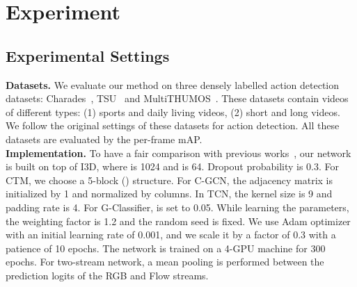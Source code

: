 \documentclass{bmvc2k}
\begin{document}
\begin{figure}[t!]
\begin{floatrow} 
  \begin{floatrow}    
\end{floatrow}

\end{floatrow}
\end{figure}

\section{Experiment}
\subsection{Experimental Settings}
\textbf{Datasets.}
We evaluate our method on three densely labelled action detection datasets: Charades~\cite{sigurdsson2017asynchronous}, TSU~\cite{dai2020toyota} and MultiTHUMOS~\cite{multi-thumos}. 
These datasets contain videos of different types: (1) sports and daily living videos, (2) short and long videos. 
We follow the original settings of these datasets for action detection. All these datasets are evaluated by the per-frame mAP.\\
\textbf{Implementation.}
To have a fair comparison with previous works~\cite{TGM1,MLAD,superevent}, our network is built on top of I3D, where  is 1024 and  is 64. Dropout probability is 0.3. For CTM, we choose a 5-block () structure. For C-GCN, the adjacency matrix is initialized by 1 and normalized by columns. 
In TCN, the kernel size  is 9 and padding rate is 4. For G-Classifier,  is set to 0.05. While learning the parameters, the weighting factor  is 1.2 and the random seed is fixed.   
We use Adam optimizer~\cite{adam_optimizer} with an initial learning rate of 0.001, and we scale it by a factor of 0.3 with a patience of 10 epochs. The network is trained on a 4-GPU machine for 300 epochs. For two-stream network, a mean pooling is performed between the prediction logits of the RGB and Flow streams.
\end{document}

